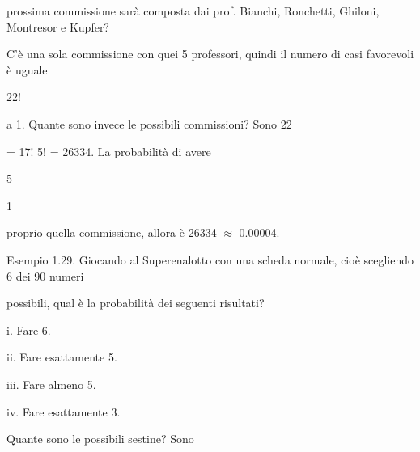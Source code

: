 \documentclass[a4paper,portrait,12pt]{article}
\begin{document}
\begin{flushleft}
prossima commissione sar\`{a} composta dai prof. Bianchi, Ronchetti, Ghiloni, Montresor e Kupfer?
\end{flushleft}


\begin{flushleft}
C'\`{e} una sola commissione con quei 5 professori, quindi il numero di casi favorevoli \`{e} uguale
\end{flushleft}


22!


\begin{flushleft}
a 1. Quante sono invece le possibili commissioni? Sono 22
\end{flushleft}


\begin{flushleft}
= 17! 5! = 26334. La probabilit\`{a} di avere
\end{flushleft}


5


1


\begin{flushleft}
proprio quella commissione, allora \`{e} 26334 $\approx$ 0.00004.
\end{flushleft}


\begin{flushleft}
Esempio 1.29. Giocando al Superenalotto con una scheda normale, cio\`{e} scegliendo 6 dei 90 numeri
\end{flushleft}


\begin{flushleft}
possibili, qual \`{e} la probabilit\`{a} dei seguenti risultati?
\end{flushleft}


\begin{flushleft}
i. Fare 6.
\end{flushleft}


\begin{flushleft}
ii. Fare esattamente 5.
\end{flushleft}


\begin{flushleft}
iii. Fare almeno 5.
\end{flushleft}


\begin{flushleft}
iv. Fare esattamente 3.
\end{flushleft}





\begin{flushleft}
Quante sono le possibili sestine? Sono
\end{flushleft}
\end{document}
